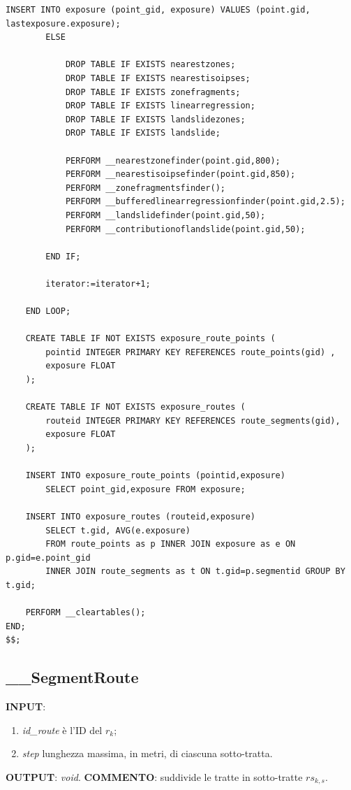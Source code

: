 \begin{lstlisting}[style = mystyle]
			INSERT INTO exposure (point_gid, exposure) VALUES (point.gid, lastexposure.exposure);
		ELSE

			DROP TABLE IF EXISTS nearestzones;
			DROP TABLE IF EXISTS nearestisoipses;
			DROP TABLE IF EXISTS zonefragments;
			DROP TABLE IF EXISTS linearregression;
			DROP TABLE IF EXISTS landslidezones;
			DROP TABLE IF EXISTS landslide;
	
			PERFORM __nearestzonefinder(point.gid,800);
			PERFORM __nearestisoipsefinder(point.gid,850);
			PERFORM __zonefragmentsfinder();
			PERFORM __bufferedlinearregressionfinder(point.gid,2.5);
			PERFORM __landslidefinder(point.gid,50);
			PERFORM __contributionoflandslide(point.gid,50);

		END IF;

		iterator:=iterator+1;

	END LOOP;

	CREATE TABLE IF NOT EXISTS exposure_route_points (
		pointid INTEGER PRIMARY KEY REFERENCES route_points(gid) ,
		exposure FLOAT
	);
	
	CREATE TABLE IF NOT EXISTS exposure_routes (
		routeid INTEGER PRIMARY KEY REFERENCES route_segments(gid),
		exposure FLOAT
	);

	INSERT INTO exposure_route_points (pointid,exposure) 
		SELECT point_gid,exposure FROM exposure;
	
	INSERT INTO exposure_routes (routeid,exposure) 
		SELECT t.gid, AVG(e.exposure) 
		FROM route_points as p INNER JOIN exposure as e ON p.gid=e.point_gid
		INNER JOIN route_segments as t ON t.gid=p.segmentid GROUP BY t.gid;

	PERFORM __cleartables();
END;
$$;

\end{lstlisting}

\subsection{\_\_SegmentRoute}

\textbf{INPUT}: 
\begin{enumerate}
	\item \textit{id\_route} è l'ID del $r_k$;
	\item \textit{step} lunghezza massima, in metri, di ciascuna sotto-tratta. 
\end{enumerate}
\textbf{OUTPUT}: \textit{void}. \newline
\textbf{COMMENTO}: suddivide le tratte in sotto-tratte $rs_{k,s}$.

